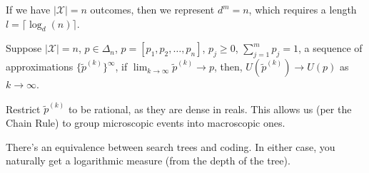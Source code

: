 If we have \( |\mathcal{X}| = n \) outcomes, then we represent \( d^m = n \), which requires a length \( l = \lceil \log_d(n) \rceil \).

Suppose \( |\mathcal{X}| = n \), \( p \in \Delta_n \), \( p = [p_1, p_2, \ldots, p_n] \), \( p_j \geq 0 \), \( \sum_{j=1}^m p_j = 1 \), a sequence of approximations \( \{\tilde{p}^{(k)}\}^\infty \), if \( \lim_{k \to \infty} \tilde{p}^{(k)} \to p \), then, \( U(\tilde{p}^{(k)}) \to U(p) \) as \( k \to \infty \).

Restrict \( \tilde{p}^{(k)} \) to be rational, as they are dense in reals. This allows us (per the Chain Rule) to group microscopic events into macroscopic ones.

There's an equivalence between search trees and coding. In either case, you naturally get a logarithmic measure (from the depth of the tree).
